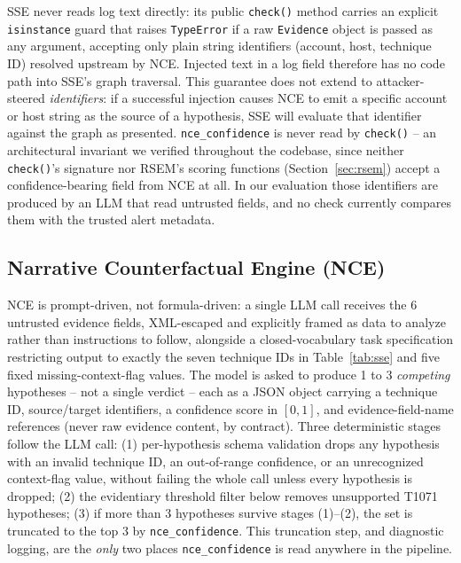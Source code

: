 \documentclass[conference]{IEEEtran}
\begin{document}
SSE never reads log text directly: its public \texttt{check()} method carries an explicit \texttt{isinstance} guard that raises \texttt{TypeError} if a raw \texttt{Evidence} object is passed as any argument, accepting only plain string identifiers (account, host, technique ID) resolved upstream by NCE. Injected text in a log field therefore has no code path into SSE's graph traversal. This guarantee does not extend to attacker-steered \textit{identifiers}: if a successful injection causes NCE to emit a specific account or host string as the source of a hypothesis, SSE will evaluate that identifier against the graph as presented. \texttt{nce\_confidence} is never read by \texttt{check()} -- an architectural invariant we verified throughout the codebase, since neither \texttt{check()}'s signature nor RSEM's scoring functions (Section~\ref{sec:rsem}) accept a confidence-bearing field from NCE at all. In our evaluation those identifiers are produced by an LLM that read untrusted fields, and no check currently compares them with the trusted alert metadata.

\subsection{Narrative Counterfactual Engine (NCE)}

NCE is prompt-driven, not formula-driven: a single LLM call receives the 6 untrusted evidence fields, XML-escaped and explicitly framed as data to analyze rather than instructions to follow, alongside a closed-vocabulary task specification restricting output to exactly the seven technique IDs in Table~\ref{tab:sse} and five fixed missing-context-flag values. The model is asked to produce 1 to 3 \textit{competing} hypotheses -- not a single verdict -- each as a JSON object carrying a technique ID, source/target identifiers, a confidence score in $[0,1]$, and evidence-field-name references (never raw evidence content, by contract). Three deterministic stages follow the LLM call: (1) per-hypothesis schema validation drops any hypothesis with an invalid technique ID, an out-of-range confidence, or an unrecognized context-flag value, without failing the whole call unless every hypothesis is dropped; (2) the evidentiary threshold filter below removes unsupported T1071 hypotheses; (3) if more than 3 hypotheses survive stages (1)--(2), the set is truncated to the top 3 by \texttt{nce\_confidence}. This truncation step, and diagnostic logging, are the \textit{only} two places \texttt{nce\_confidence} is read anywhere in the pipeline.
\end{document}
